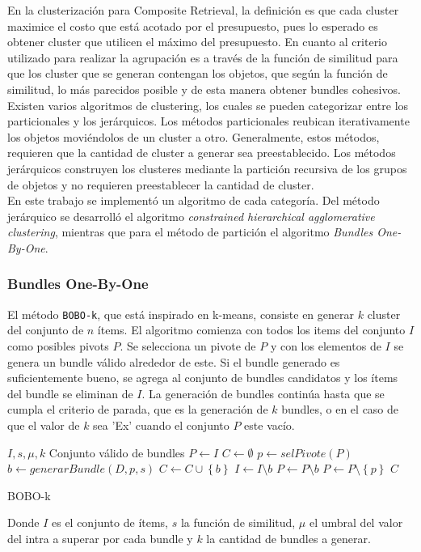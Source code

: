 En la clusterización para Composite Retrieval, la definición es que cada cluster maximice el costo que está acotado por el presupuesto, pues lo esperado es obtener cluster que utilicen el máximo del presupuesto. En cuanto al criterio utilizado para realizar la agrupación es a través de la función de similitud para que los cluster que se generan contengan los objetos, que según la función de similitud, lo más parecidos posible y de esta manera obtener bundles cohesivos.\\
Existen varios algoritmos de clustering, los cuales se pueden categorizar entre los particionales y los jerárquicos. Los métodos particionales reubican iterativamente los objetos moviéndolos de un cluster a otro. Generalmente, estos métodos, requieren que la cantidad de cluster a generar sea preestablecido. Los métodos jerárquicos construyen los clusteres mediante la partición recursiva de los grupos de objetos y no requieren preestablecer la cantidad de cluster.\\
En este trabajo se implementó un algoritmo de cada categoría. Del método jerárquico se desarrolló el algoritmo \textit{constrained hierarchical agglomerative clustering}, mientras que para el método de partición el algoritmo \textit{Bundles One-By-One}.\\

\subsubsection{Bundles One-By-One}
El método \texttt{BOBO-k}, que está inspirado en k-means, consiste en generar $k$ cluster del conjunto de $n$ ítems. El algoritmo comienza con todos los items del conjunto $I$ como posibles pivots $P$. Se selecciona un pivote de $P$ y con los elementos de $I$ se genera un bundle válido alrededor de este. Si el bundle generado es suficientemente bueno, se agrega al conjunto de bundles candidatos y los ítems del bundle se eliminan de $I$. La generación de bundles continúa hasta que se cumpla el criterio de parada, que es la generación de $k$ bundles, o en el caso de que el valor de $k$ sea 'Ex' cuando el conjunto $P$ este vacío.

\begin{algorithm}[H]
\begin{algorithmic}[1]
\REQUIRE $I, s, \mu, k $
\ENSURE Conjunto válido de bundles
\STATE $P \leftarrow I$
\STATE $C \leftarrow \emptyset$
\STATE $p \leftarrow selPivote(P)$
\STATE $b \leftarrow generarBundle(D, p, s)$
\STATE $C \leftarrow C \cup \left\{b\right\}$
\STATE $I \leftarrow I \setminus b$
\STATE $P \leftarrow P \setminus b$
\ELSE
\STATE $P \leftarrow P \setminus \left\{p\right\}$
\ENDIF
\ENDWHILE
\RETURN $C$
\end{algorithmic}
\caption{BOBO-k}\label{alg:bobo}
\end{algorithm}
Donde $I$ es el conjunto de ítems, $s$ la función de similitud, $\mu$ el umbral del valor del intra a superar por cada bundle y $k$ la cantidad de bundles a generar.

